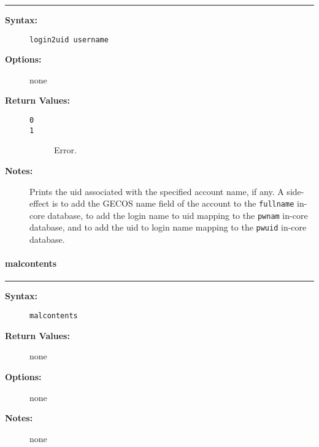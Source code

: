 \hrule
\begin{description}
\item[{\bf Syntax:}] \mbox{}

{\tt login2uid username}

\item[{\bf Options:}] \mbox{}

none  

\item[{\bf Return Values:}] \mbox{}

\begin{description}
\item[{\tt 0}] \mbox{}



\item[{\tt 1}] \mbox{}

Error.

\end{description}


\item[{\bf Notes:}] \mbox{}

Prints the uid associated with the specified
account name, if any. A side-effect is to add the GECOS name field of 
the account to the {\tt fullname} in-core database, to add the login 
name to uid mapping to the {\tt pwnam} in-core database, and to add 
the uid to login name mapping to the {\tt pwuid} in-core database.

\end{description}


\vspace {2pt}


\paragraph{malcontents}

\hrule
\begin{description}
\item[{\bf Syntax:}] \mbox{}

{\tt malcontents}

\item[{\bf Return Values:}] \mbox{}

none  

\item[{\bf Options:}] \mbox{}

none  

\item[{\bf Notes:}] \mbox{}

none  

\end{description}


